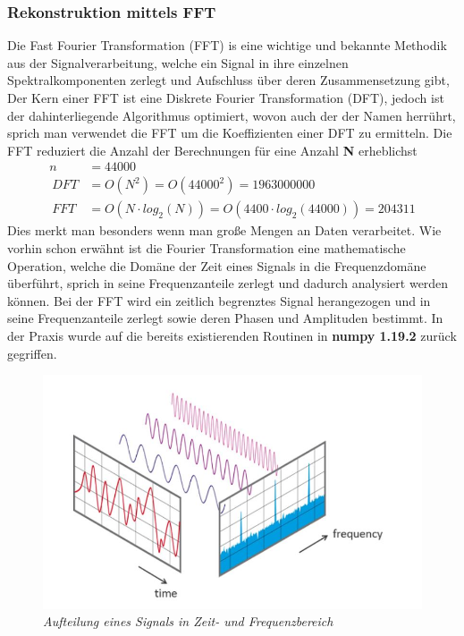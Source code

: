 \documentclass[11pt]{report}
\begin{document}
\subsubsection{Rekonstruktion mittels FFT}
Die Fast Fourier Transformation (FFT) is eine wichtige und bekannte Methodik aus der Signalverarbeitung, welche ein Signal in ihre einzelnen Spektralkomponenten zerlegt und Aufschluss über deren Zusammensetzung gibt, Der Kern einer FFT ist eine Diskrete Fourier Transformation (DFT), jedoch ist der dahinterliegende Algorithmus optimiert, wovon auch der der Namen herrührt, sprich man verwendet die FFT um die Koeffizienten einer DFT zu ermitteln. Die FFT reduziert die Anzahl der Berechnungen für eine Anzahl \textbf{N} erheblichst
\begin{equation}
\begin{aligned}
n &= 44000\\\
DFT &= O(N^{2}) = O(44000^2) = 1 963 000 000 \\\
FFT &= O(N\cdot log_2(N)) = O(4400\cdot log_2(44000)) = 204311
\end{aligned}
\end{equation}
Dies merkt man besonders wenn man große Mengen an Daten verarbeitet. Wie vorhin schon erwähnt ist die Fourier Transformation eine mathematische Operation, welche die Domäne der Zeit eines Signals in die Frequenzdomäne überführt, sprich in seine Frequenzanteile zerlegt und dadurch analysiert werden können. Bei der FFT wird ein zeitlich begrenztes Signal herangezogen und in seine Frequenzanteile zerlegt sowie deren Phasen und Amplituden bestimmt. In der Praxis wurde auf die bereits existierenden Routinen in \textbf{numpy 1.19.2} zurück gegriffen.
\begin{figure}[H]
\centering
\includegraphics[scale=0.6]{./Grafiken/Fitting/FFT/FFT_time_und_frequenz_anteile.jpg}
\caption{\textit{Aufteilung eines Signals in Zeit- und Frequenzbereich}}
\end{figure}
\end{document}
